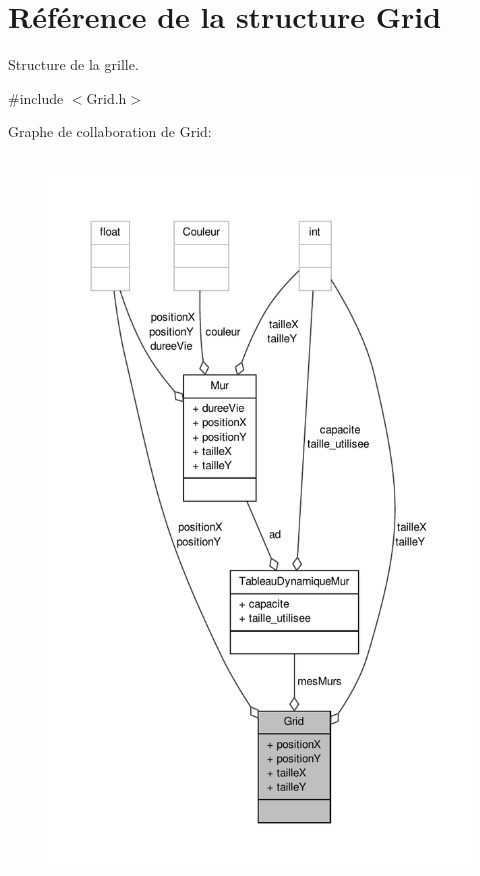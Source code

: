 \hypertarget{structGrid}{\section{Référence de la structure Grid}
\label{structGrid}
}


Structure de la grille.  




{\ttfamily \#include $<$Grid.\-h$>$}



Graphe de collaboration de Grid\-:\nopagebreak
\begin{figure}[H]
\begin{center}
\leavevmode
\includegraphics[height=550pt]{structGrid__coll__graph}
\end{center}
\end{figure}
